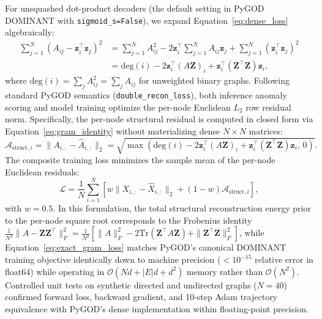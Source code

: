 \documentclass[11pt,a4paper]{article}
\begin{document}
For unsquashed dot-product decoders (the default setting in PyGOD DOMINANT with \texttt{sigmoid\_s=False}), we expand Equation~\eqref{eq:dense_loss} algebraically:
\begin{align}
\sum_{j=1}^N \left(A_{ij} - \mathbf{z}_i^\top \mathbf{z}_j\right)^2 &= \sum_{j=1}^N A_{ij}^2 - 2 \mathbf{z}_i^\top \sum_{j=1}^N A_{ij} \mathbf{z}_j + \sum_{j=1}^N (\mathbf{z}_i^\top \mathbf{z}_j)^2 \nonumber \\
&= \mathrm{deg}(i) - 2 \mathbf{z}_i^\top \left(A \mathbf{Z}\right)_i + \mathbf{z}_i^\top \left(\mathbf{Z}^\top \mathbf{Z}\right) \mathbf{z}_i,
\label{eq:gram_identity}
\end{align}
where $\mathrm{deg}(i) = \sum_j A_{ij}^2 = \sum_j A_{ij}$ for unweighted binary graphs. Following standard PyGOD semantics (\texttt{double\_recon\_loss}), both inference anomaly scoring and model training optimize the per-node Euclidean $L_2$ row residual norm. Specifically, the per-node structural residual is computed in closed form via Equation~\eqref{eq:gram_identity} without materializing dense $N \times N$ matrices:
\begin{equation}
\mathcal{A}_{\mathrm{struct}, i} = \|A_{i,:} - \hat{A}_{i,:}\|_2 = \sqrt{\max\left(\mathrm{deg}(i) - 2 \mathbf{z}_i^\top (A \mathbf{Z})_i + \mathbf{z}_i^\top (\mathbf{Z}^\top \mathbf{Z}) \mathbf{z}_i, \, 0\right)}.
\label{eq:node_structural_score}
\end{equation}
The composite training loss minimizes the sample mean of the per-node Euclidean residuals:
\begin{equation}
\mathcal{L} = \frac{1}{N} \sum_{i=1}^N \left[ w \|X_{i,:} - \hat{X}_{i,:}\|_2 + (1 - w) \mathcal{A}_{\mathrm{struct}, i} \right],
\label{eq:exact_gram_loss}
\end{equation}
with $w=0.5$. In this formulation, the total structural reconstruction energy prior to the per-node square root corresponds to the Frobenius identity $\frac{1}{N^2}\|A - \mathbf{Z}\mathbf{Z}^\top\|_F^2 = \frac{1}{N^2} [\|A\|_F^2 - 2 \mathrm{Tr}(\mathbf{Z}^\top A \mathbf{Z}) + \|\mathbf{Z}^\top \mathbf{Z}\|_F^2]$, while Equation~\eqref{eq:exact_gram_loss} matches PyGOD's canonical DOMINANT training objective identically down to machine precision ($< 10^{-15}$ relative error in float64) while operating in $\mathcal{O}(N d + |E| d + d^2)$ memory rather than $\mathcal{O}(N^2)$. Controlled unit tests on synthetic directed and undirected graphs ($N=40$) confirmed forward loss, backward gradient, and 10-step Adam trajectory equivalence with PyGOD's dense implementation within floating-point precision.
\end{document}
